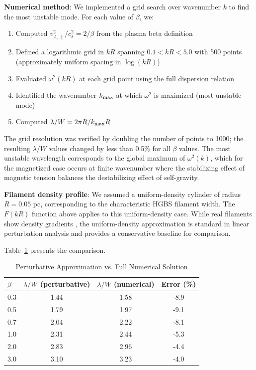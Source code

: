\documentclass[11pt,a4paper]{article}
\begin{document}
\textbf{Numerical method}: We implemented a grid search over wavenumber $k$ to find the most unstable mode. For each value of $\beta$, we:
\begin{enumerate}
    \item Computed $v_{A,\parallel}^2/c_s^2 = 2/\beta$ from the plasma beta definition
    \item Defined a logarithmic grid in $kR$ spanning $0.1 < kR < 5.0$ with 500 points (approximately uniform spacing in $\log(kR)$)
    \item Evaluated $\omega^2(kR)$ at each grid point using the full dispersion relation
    \item Identified the wavenumber $k_{\rm max}$ at which $\omega^2$ is maximized (most unstable mode)
    \item Computed $\lambda/W = 2\pi R/k_{\rm max}R$
\end{enumerate}

The grid resolution was verified by doubling the number of points to 1000; the resulting $\lambda/W$ values changed by less than 0.5\% for all $\beta$ values. The most unstable wavelength corresponds to the global maximum of $\omega^2(k)$, which for the magnetized case occurs at finite wavenumber where the stabilizing effect of magnetic tension balances the destabilizing effect of self-gravity.

\textbf{Filament density profile}: We assumed a uniform-density cylinder of radius $R = 0.05$ pc, corresponding to the characteristic HGBS filament width. The $F(kR)$ function above applies to this uniform-density case. While real filaments show density gradients \citep{Arzoumanian2011}, the uniform-density approximation is standard in linear perturbation analysis and provides a conservative baseline for comparison.

Table~\ref{tab:perturbative_comparison} presents the comparison.

\begin{table}[H]
\centering
\caption{Perturbative Approximation vs. Full Numerical Solution}
\label{tab:perturbative_comparison}
\small
\begin{tabular}{lccc}
\toprule
$\beta$ & $\lambda/W$ (perturbative) & $\lambda/W$ (numerical) & Error (\%) \\
\midrule
0.3 & 1.44 & 1.58 & -8.9 \\
0.5 & 1.79 & 1.97 & -9.1 \\
0.7 & 2.04 & 2.22 & -8.1 \\
1.0 & 2.31 & 2.44 & -5.3 \\
2.0 & 2.83 & 2.96 & -4.4 \\
3.0 & 3.10 & 3.23 & -4.0 \\
\bottomrule
\end{tabular}
\end{table}
\end{document}
